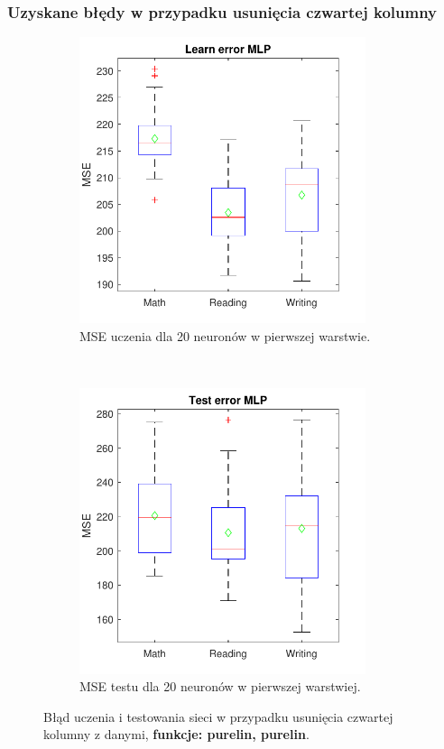 \documentclass[12pt]{article}
\begin{document}
\subsubsection{Uzyskane błędy w przypadku usunięcia czwartej kolumny}
\begin{figure}[H]
\centering
\begin{subfigure}[t]{0.48\textwidth} 
\centering
\includegraphics[height=3.3in]{purelin_purelin_20_without_4_learnBoxplot.pdf}
\caption{MSE uczenia dla  20 neuronów w pierwszej warstwie.}
\end{subfigure}
~~
\begin{subfigure}[t]{0.48\textwidth} 
\centering
\includegraphics[height=3.3in]{purelin_purelin_20_without_4_testBoxplot.pdf}
\caption{MSE testu dla  20  neuronów w pierwszej warstwiej.}
\end{subfigure}

\caption{Błąd uczenia i testowania sieci w przypadku usunięcia czwartej  kolumny z danymi, \textbf{funkcje: purelin, purelin}.}
\end{figure}
\end{document}
